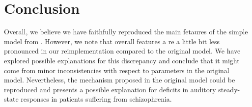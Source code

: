 \documentclass[10pt,a4paper,onecolumn]{article}
\begin{document}
\FloatBarrier

\section{Conclusion}\label{conclusion}

Overall, we believe we have faithfully reproduced the main fetaures of
the simple model from \autocite{Vierling2008}. However, we note that
overall features a re a little bit less pronounced in our
reimplementation compared to the original model. We have explored possible explanations for this discrepancy
and conclude that it might come from minor inconsistencies with respect to parameters in the original model. Nevertheless,
the mechanism proposed in the original model could be reproduced and presents a possible explanation for deficits in 
auditory steady-state responses in patients suffering from schizophrenia.

{\sffamily \small
  \printbibliography[title=References]
}
\end{document}
